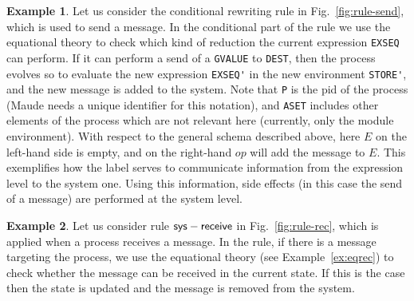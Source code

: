 \documentclass{article}[12pt,a4paper]
\theoremstyle{definition}
\newtheorem{example}{Example}[section]
\begin{document}
\begin{example}\label{ex:send}
  Let us consider the conditional rewriting rule in Fig.~\ref{fig:rule-send}, which is used to send a message. In the conditional part of the
  rule we use the equational theory to check which kind of reduction the current expression \verb+EXSEQ+ can perform. If it can perform a send of a \verb+GVALUE+ to \verb+DEST+, then the process evolves so to evaluate the new expression \verb+EXSEQ'+ in the new environment \verb+STORE'+, and the new message is added to the system. Note that \verb+P+ is the pid of the process (Maude needs a unique identifier for this notation), and \verb+ASET+ includes other elements of the process which are not relevant here (currently, only the module environment).
  With respect to the general schema described above, here $E$ on the left-hand side is empty, and
  on the right-hand $op$ will add the message to $E$.
    This exemplifies how the label serves to communicate information from the
    expression level to the system one. Using this information, side effects (in this case the send of a message) are performed at the system level.
\end{example}

\begin{example}\label{ex:rec}
  Let us consider rule $\mathsf{sys-receive}$ in Fig.~\ref{fig:rule-rec}, which 
  is applied when a process receives a message. In the rule, if there is a message targeting the process, we use the equational theory (see Example~\ref{ex:eqrec}) to check whether the message can be received in the current state. If this is the case then the state is updated and the message is removed from the system.
\end{example}
\end{document}
